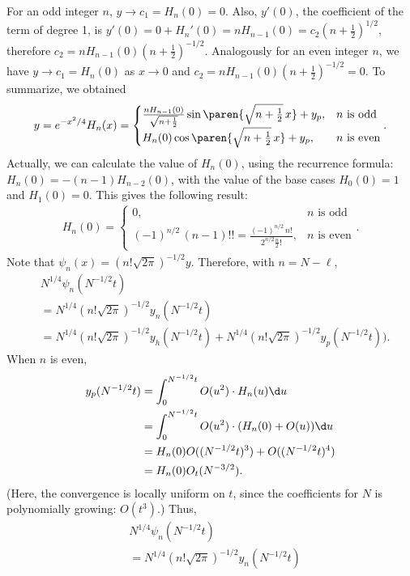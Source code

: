 \documentclass{homework}
\begin{document}
{For an odd integer $n$, $y\to c_1 = H_n(0) = 0$. Also, $y'(0)$, the coefficient of the term of degree 1, is $y'(0) = 0 + H_n'(0) = nH_{n-1}(0) = c_2 (n + \frac12)^{1/2}$, therefore $c_2 = nH_{n-1}(0)(n + \frac12)^{-1/2}$. Analogously for an even integer $n$, we have $y \to c_1 = H_n(0)$ as $x\to 0$ and $c_2 = nH_{n-1}(0)(n + \frac12)^{-1/2} = 0.$ To summarize, we obtained
\begin{align*}
    y = e^{-x^2/4}H_n(x) = \begin{cases}
        \frac{n H_{n-1}(0)}{\sqrt{n + \frac12}}\sin\paren{\sqrt{n + \frac12} \, x} + y_p,&\text{$n$ is odd} \\
        H_n(0)\cos\paren{\sqrt{n + \frac12} \, x} + y_p,&\text{$n$ is even}
    \end{cases}.
\end{align*}
Actually, we can calculate the value of $H_n(0)$, using the recurrence formula: $H_n(0) = -(n-1)H_{n-2}(0)$, with the value of the base cases $H_0(0) = 1$ and $H_1(0) = 0$. This gives the following result:
\begin{align*}
    H_n(0) = \begin{cases}
        0,&\text{$n$ is odd} \\
        (-1)^{n/2}\,(n-1)!! = \frac{ (-1)^{n/2}\,n! }{ 2^{n/2} \frac n2! },&\text{$n$ is even}
    \end{cases}.
\end{align*}
Note that $\psi_n(x) = (n!\sqrt{2\pi})^{-1/2} y$. Therefore, with $n=N-\ell$,
\begin{align*}
    & N^{1/4} \psi_n(N^{-1/2}t)
    \\ &= N^{1/4} (n! \sqrt{2\pi})^{-1/2} y_n(N^{-1/2}t)
    \\ &= N^{1/4} (n! \sqrt{2\pi})^{-1/2} y_h(N^{-1/2}t) + N^{1/4} (n! \sqrt{2\pi})^{-1/2} y_p(N^{-1/2}t)).
\end{align*}
When $n$ is even,
\begin{align*}
    y_p(N^{-1/2}t) &= \int_0^{N^{-1/2}t} O(u^2)\cdot H_n(u)\d u
    \\ &= \int_0^{N^{-1/2}t} O(u^2)\cdot (H_n(0) + O(u))\d u
    \\ &= H_n(0) O((N^{-1/2}t)^3) + O((N^{-1/2}t)^4)
    \\ &= H_n(0) O_t(N^{-3/2}).
\end{align*}
(Here, the convergence is locally uniform on $t$, since the coefficients for $N$ is polynomially growing: $O(t^3)$.) Thus,
\begin{align*}
    & N^{1/4} \psi_n(N^{-1/2}t)
    \\ &= N^{1/4} (n! \sqrt{2\pi})^{-1/2} y_n(N^{-1/2}t)

\end{align*}}
\end{document}
